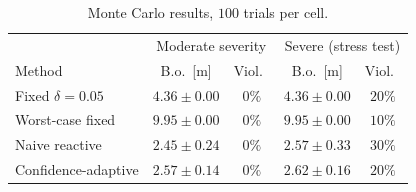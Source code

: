 %            
%
%


\begin{table}[t]
\centering
\caption{Monte Carlo results, $100$ trials per cell.}
\label{tab:montecarlo}
\small
\setlength{\tabcolsep}{3pt}
\begin{tabular}{lcccc}
\toprule
 & \multicolumn{2}{c}{Moderate severity} & \multicolumn{2}{c}{Severe (stress test)} \\
Method & B.o.\ [m] & Viol.\ & B.o.\ [m] & Viol.\ \\
\midrule
Fixed $\delta=0.05$ & $4.36\pm0.00$ & $0\%$ & $4.36\pm0.00$ & $20\%$ \\
Worst-case fixed & $9.95\pm0.00$ & $0\%$ & $9.95\pm0.00$ & $10\%$ \\
Naive reactive & $2.45\pm0.24$ & $0\%$ & $2.57\pm0.33$ & $30\%$ \\
Confidence-adaptive & $2.57\pm0.14$ & $0\%$ & $2.62\pm0.16$ & $20\%$ \\
\bottomrule
\end{tabular}
\end{table}

